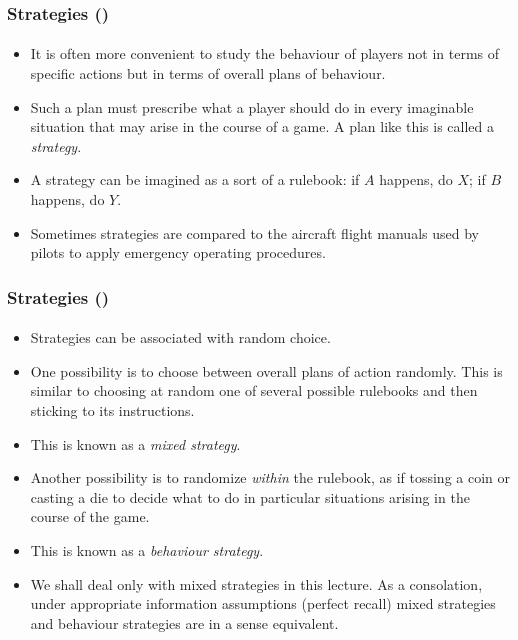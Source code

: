\documentclass[10pt]{beamer}
\theoremstyle{definition}
\begin{document}
\begin{frame}[fragile]\setcounter{slidenum}{1}
\frametitle{Strategies ()}
\framesubtitle{}
\begin{itemize}\itemsep1em
\item It is often more convenient to study the behaviour of players not in terms of specific actions but in terms of overall plans of behaviour.
\item Such a plan must prescribe what a player should do in every imaginable situation that may arise in the course of a game. A plan like this is called a \emph{strategy}.
\item A strategy can be imagined as a sort of a rulebook: if $ A $ happens, do $ X $; if $ B $ happens, do $ Y $.
\item Sometimes strategies are compared to the aircraft flight manuals used by pilots to apply emergency operating procedures.
\end{itemize}
\end{frame}



\begin{frame}[fragile]
\frametitle{Strategies ()}
\framesubtitle{}
\begin{itemize}\itemsep1em
\item Strategies can be associated with random choice.
\item One possibility is to choose between overall plans of action randomly. This is similar to choosing at random one of several possible rulebooks and then sticking to its instructions.
\item This is known as a \emph{mixed strategy}.\pause
\item Another possibility is to randomize \emph{within} the rulebook, as if tossing a coin or casting a die to decide what to do in particular situations arising in the course of the game.
\item This is known as a \emph{behaviour strategy}.\pause
\item We shall deal only with mixed strategies in this lecture. As a consolation, under appropriate information assumptions (perfect recall) mixed strategies and behaviour strategies are in a sense equivalent.
\end{itemize}
\end{frame}
\end{document}
